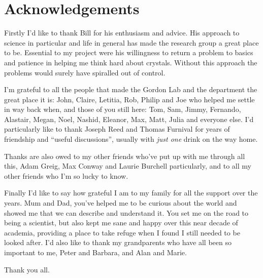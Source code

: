 \clearpage

\doublespacing

\section*{Acknowledgements}


Firstly I'd like to thank Bill for his enthusiasm and advice. His approach to science in particular and life in general has made the research group a great place to be. Essential to my project were his willingness to return a problem to basics and patience in helping me think hard about crystals. Without this approach the problems would surely have spiralled out of control.


I'm grateful to all the people that made the Gordon Lab and the department the great place it is: John, Claire, Letitia, Rob, Philip and Joe who helped me settle in way back when, and those of you still here: Tom, Sam, Jimmy, Fernando, Alastair, Megan, Noel, Nashid, Eleanor, Max, Matt, Julia and everyone else. 
I'd particularly like to thank Joseph Reed and Thomas Furnival for years of friendship and ``useful discussions'', usually with \emph{just one} drink on the way home.

Thanks are also owed to my other friends who've put up with me through all this, Adam Greig, Max Conway and Laurie Burchell particularly, and to all my other friends who I'm so lucky to know.

Finally I'd like to say how grateful I am to my family for all the support over the years.
Mum and Dad, you've helped me to be curious about the world and showed me that we can describe and understand it. You set me on the road to being a scientist, but also kept me sane and happy over this near decade of academia, providing a place to take refuge when I found I still needed to be looked after. I'd also like to thank my grandparents who have all been so important to me, Peter and Barbara, and Alan and Marie.


Thank you all.

























































